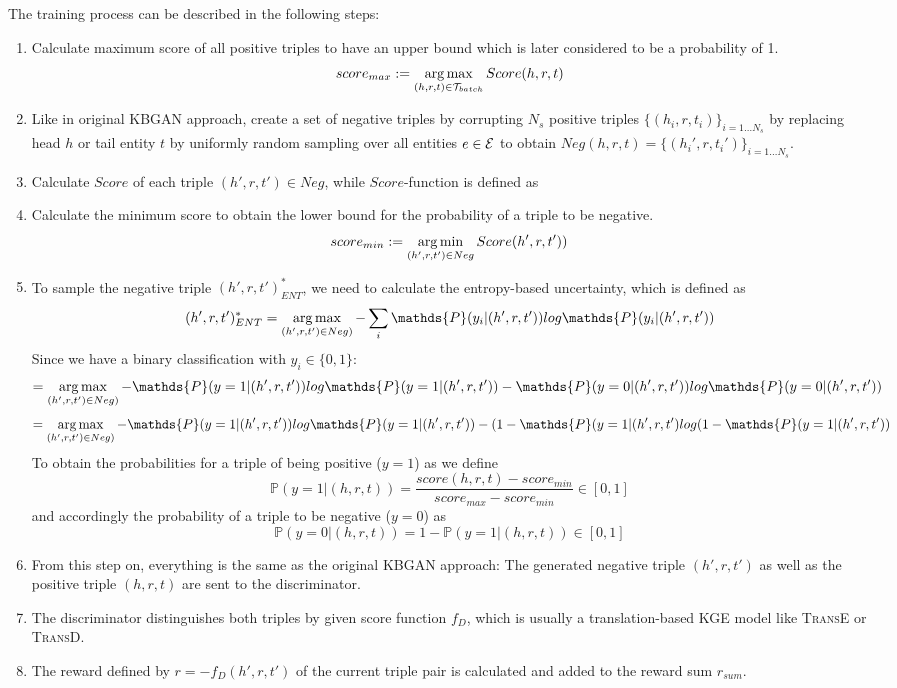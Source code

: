 The training process can be described in the following steps:
\begin{enumerate}
    \item  Calculate maximum score of all positive triples to have an upper bound which is later considered to be a probability of 1.
    $$score_{max} := \operatorname*{arg\,max}_{(h,r,t) \in \mathcal{T}_{batch}}{Score(h,r,t)}$$

    \item 
    Like in original \ac{KBGAN} approach, create a set of negative triples by corrupting $N_s$ positive triples $\{(h_i,r,t_i)\}_{i=1\dots N_s}$ by replacing head $h$ or tail entity $t$ by uniformly random sampling over all entities $e \in \mathcal{E}$ to obtain $Neg(h,r,t)=\{(h_i',r,t_i')\}_{i=1\dots N_s}$.
    
    \item 
    Calculate $Score$ of each triple $(h',r,t') \in Neg$, while $Score$-function is defined as 
    
    \item 
    Calculate the minimum score to obtain the lower bound for the probability of a triple to be negative. 
    $$score_{min} := \operatorname*{arg\,min}_{(h', r, t') \in Neg}{Score(h', r, t'))}$$
    
    \item 
    To sample the negative triple $(h',r,t')^{*}_{ENT}$, we need to calculate the entropy-based uncertainty, which is defined as
    $$(h',r,t')^{*}_{ENT} = \argmax_{(h',r,t') \in Neg)} - \sum_{i}{\mathds{P}(y_i | (h',r,t')) log \mathds{P}(y_i|(h',r,t'))}$$
    Since we have a binary classification with $y_i \in \{0,1\}$:
    $$= \argmax_{(h',r,t') \in Neg)} - \mathds{P}(y = 1| (h',r,t')) log \mathds{P}(y = 1|(h',r,t')) - \mathds{P}(y = 0| (h',r,t')) log \mathds{P}(y = 0|(h',r,t'))$$
    $$= \argmax_{(h',r,t') \in Neg)} - \mathds{P}(y = 1| (h',r,t')) log \mathds{P}(y = 1|(h',r,t')) - (1 - \mathds{P}(y = 1|(h',r,t') log(1 - \mathds{P}(y = 1|(h',r,t'))$$
    To obtain the probabilities for a triple of being positive ($y=1$) as we define
    $$\mathds{P}(y = 1|(h, r, t)) = \frac{score(h, r, t) - score_{min}}{score_{max} - score_{min}} \in [0, 1]$$
    and accordingly the probability of a triple to be negative ($y=0$) as
    $$\mathds{P}(y = 0|(h, r, t)) = 1 - \mathds{P}(y = 1|(h, r, t)) \in [0,1]$$
    
    \item 
    From this step on, everything is the same as the original \ac{KBGAN} approach:
    The generated negative triple $(h',r,t')$ as well as the positive triple $(h, r, t)$ are sent to the discriminator.
    
    \item 
    The discriminator distinguishes both triples by given score function $f_D$, which is usually a translation-based \ac{KGE} model like \textsc{TransE} or \textsc{TransD}.
    
    \item 
    The reward defined by $r = - f_D(h',r,t')$ of the current triple pair is calculated and added to the reward sum $r_{sum}$.
    
\end{enumerate}
